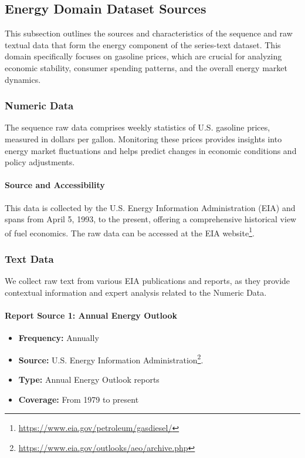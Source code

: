 \subsection{Energy Domain Dataset Sources}

This subsection outlines the sources and characteristics of the sequence and raw textual data that form the energy component of the series-text dataset. This domain specifically focuses on gasoline prices, which are crucial for analyzing economic stability, consumer spending patterns, and the overall energy market dynamics.

\subsubsection{Numeric Data}
The sequence raw data comprises weekly statistics of U.S. gasoline prices, measured in dollars per gallon. Monitoring these prices provides insights into energy market fluctuations and helps predict changes in economic conditions and policy adjustments.

\paragraph{Source and Accessibility}
This data is collected by the U.S. Energy Information Administration (EIA) and spans from April 5, 1993, to the present, offering a comprehensive historical view of fuel economics. The raw data can be accessed at the EIA website\footnote{\url{https://www.eia.gov/petroleum/gasdiesel/}}.

\subsubsection{Text Data}
We collect raw text from various EIA publications and reports, as they provide contextual information and expert analysis related to the Numeric Data. 


\paragraph{Report Source 1: Annual Energy Outlook}
\begin{itemize}
    \item \textbf{Frequency:} Annually
    \item \textbf{Source:} U.S. Energy Information Administration\footnote{\url{https://www.eia.gov/outlooks/aeo/archive.php}}.
    \item \textbf{Type:} Annual Energy Outlook reports
    \item \textbf{Coverage:} From 1979 to present
\end{itemize}

